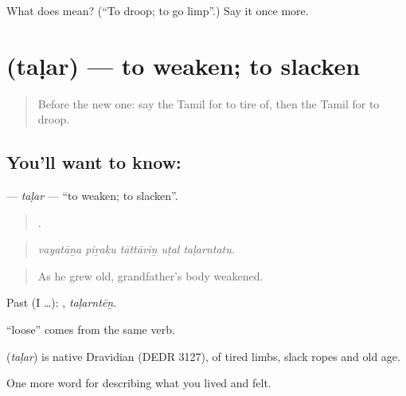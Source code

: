 \begin{tcolorbox}[breakable,colback=teal!4,colframe=teal!35!black,title={Before you move on}]
What does  mean? (\textquotedblleft{}To droop; to go limp\textquotedblright{}.) Say it once more.
\end{tcolorbox}
\section[\texorpdfstring{\ta{தளர்} (taḷar)}{தளர் (taḷar)}]{ (taḷar) — to weaken; to slacken}

\label{lesson:TA-C468-talar}



\begin{quote}
Before the new one: say the Tamil for to tire of, then the Tamil for to droop.
\end{quote}

\subsection*{You'll want to know: }
\textbf{} — \emph{taḷar} — \textquotedblleft{}to weaken; to slacken\textquotedblright{}.

\begin{quote}
    .
\end{quote}

\begin{quote}
\emph{vayatāṉa piṟaku tāttāviṉ uṭal taḷarntatu.}
\end{quote}

\begin{quote}
As he grew old, grandfather’s body weakened.
\end{quote}

Past (I …): , \emph{taḷarntēṉ}.

 \textquotedblleft{}loose\textquotedblright{} comes from the same verb.

\begin{cousinweb}
\textbf{} (\emph{taḷar}) is native Dravidian (DEDR 3127), of tired limbs, slack ropes and old age.
\end{cousinweb}

\begin{grammarlens}[title={What you've built}]
One more word for describing what you lived and felt.
\end{grammarlens}

